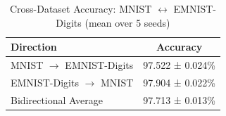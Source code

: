 
\begin{table}[h]
\centering
\caption{Cross-Dataset Accuracy: MNIST $\leftrightarrow$ EMNIST-Digits (mean over 5 seeds)}
\label{tab:extension2_mnist_emnist_digits}
\begin{tabular}{lc}
\toprule
\textbf{Direction} & \textbf{Accuracy} \\
\midrule
MNIST $\rightarrow$ EMNIST-Digits & 97.522 ± 0.024\% \\
EMNIST-Digits $\rightarrow$ MNIST & 97.904 ± 0.022\% \\
\midrule
Bidirectional Average & 97.713 ± 0.013\% \\
\bottomrule
\end{tabular}
\end{table}
